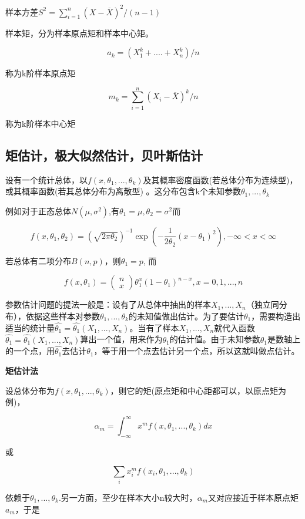 \documentclass{ctexart}
\begin{document}
	样本方差\(S^2=\sum_{i=1}^{n}(X-\overline{X})^2/(n-1)\)
	
	样本矩，分为样本原点矩和样本中心矩。
	
	\[a_k=(X_1^k+....+X_n^k)/n\]
	
	称为k阶样本原点矩
	
	\[m_k=\sum_{i=1}^{n}(X_i-\overline{X})^k/n\]
	
	称为k阶样本中心矩
	
	\subsection{矩估计，极大似然估计，贝叶斯估计}

	设有一个统计总体，以\(f(x,\theta_1,...,\theta_k)\)及其概率密度函数(若总体分布为连续型)，或其概率函数(若其总体分布为离散型)	。这分布包含k个未知参数\(\theta_1,...,\theta_k\)
	
	例如对于正态总体\(N(\mu, \sigma^2)\),有\(\theta_1 = \mu, \theta_2=\sigma^2\)而
	
	\[f(x,\theta_1,\theta_2)=(\sqrt{2\pi\theta_2})^{-1}\exp(-\frac{1}{2\theta_2}(x-\theta_1)^2), -\infty < x < \infty\]
	
	若总体有二项分布\(B(n, p)\)，则\(\theta_1=p\), 而
	
	\[f(x,\theta_1)=
	\begin{pmatrix}
	n \\ x
	\end{pmatrix}
	\theta_1^x (1-\theta_1)^{n-x}, x=0,1,...,n\]
	
	参数估计问题的提法一般是：设有了从总体中抽出的样本\(X_1,...,X_n\)（独立同分布），依据这些样本对参数\(\theta_1,...,\theta_k\)的未知值做出估计。为了要估计\(\theta_1\)，需要构造出适当的统计量\(\hat{\theta_1}=\hat{\theta_1}(X_1,...,X_n)\)。当有了样本\(X_1,...,X_n\)就代入函数\(\hat{\theta_1}=\hat{\theta_1}(X_1,...,X_n)\)算出一个值，用来作为\(\theta_1\)的估计值。由于未知参数\(\theta_1\)是数轴上的一个点，用\(\hat{\theta_1}\)去估计\(\theta_1\)，等于用一个点去估计另一个点，所以这就叫做点估计。
	
	\mbox{}
	
	\textbf{矩估计法}
	
	设总体分布为\(f(x,\theta_1,...,\theta_k)\)，则它的矩(原点矩和中心距都可以，以原点矩为例)，
	
	\[\alpha_m=\int_{-\infty}^{\infty}x^mf(x,\theta_1,...,\theta_k)dx\]
	
	或
	
	\[\sum_{i}x_i^mf(x_i,\theta_1,...,\theta_k)\]
	
	依赖于\(\theta_1,...,\theta_k\).{\color{red}另一方面，至少在样本大小n较大时，\(\alpha_m\)又对应接近于样本原点矩\(a_m\)}，于是
	
\end{document}
